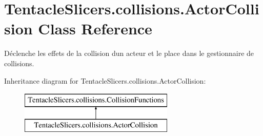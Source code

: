 \hypertarget{class_tentacle_slicers_1_1collisions_1_1_actor_collision}{}\section{Tentacle\+Slicers.\+collisions.\+Actor\+Collision Class Reference}
\label{class_tentacle_slicers_1_1collisions_1_1_actor_collision}


Déclenche les effets de la collision d\textquotesingle{}un acteur et le place dans le gestionnaire de collisions.  


Inheritance diagram for Tentacle\+Slicers.\+collisions.\+Actor\+Collision\+:\begin{figure}[H]
\begin{center}
\leavevmode
\includegraphics[height=2.000000cm]{class_tentacle_slicers_1_1collisions_1_1_actor_collision}
\end{center}
\end{figure}
